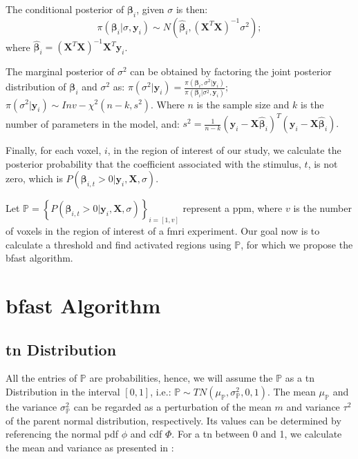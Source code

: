 The conditional posterior of $\bm{\beta}_i$, given $\sigma$ is then:
\begin{equation}
\pi \left( \bm{\beta}_i|\sigma ,\bm{y}_i \right) 
\sim N\left( \bm{\hat{\beta}}_i, 
\left( \bm{X}^T\bm{X} \right)^{-1} \sigma^2 \right);
\end{equation}
where $\bm{\hat{\beta}}_i = \left( \bm{X}^T\bm{X} \right)^{-1}\bm{X}^T \bm{y}_i$.

The marginal posterior of $\sigma^2$ can be obtained by factoring the 
joint posterior distribution of $\bm{\beta}_i$ and $\sigma^2$ as:
$
\pi (\sigma^2|\bm{y}_i) = \frac{\pi \left( \bm{\beta}_i,\sigma^2 
|\bm{y}_i \right)}{\pi \left( \bm{\beta}_i|\sigma^2 ,\bm{y}_i \right)};
$
$
\pi (\sigma^2|\bm{y}_i) \sim Inv- \chi^2(n-k,s^2).
$
Where $n$ is the sample size and $k$ is the number of parameters in the model, and:
$
s^2 = \frac{1}{n-k} \left( \bm{y}_i - \bm{X}\bm{\hat{\beta}}_i \right)^T
 \left( \bm{y}_i - \bm{X}\bm{\hat{\beta}}_i \right).
$

Finally, for each voxel, $i$, in the region of interest of our study, 
we calculate the posterior probability that the coefficient associated with the 
stimulus, $t$, is not zero, which is 
$P(\bm{\beta}_{i,t} > 0 | \bm{y}_i, \bm{X}, \sigma)$.

Let $\bm{\mathbb{P}} = \left\{ P(\bm{\beta}_{i,t} > 0 | \bm{y}_i, \bm{X},\sigma) \right\}_{i=[1,v]}$ 
represent a \gls{ppm}, where $v$ is the number of voxels in the region of interest of a \gls{fmri} experiment. 
Our goal now is to calculate a threshold and find activated regions using $\bm{\mathbb{P}}$, 
for which we propose the \gls{bfast} algorithm.

\section{\texorpdfstring{\gls{bfast}}{BFAST} Algorithm}

\subsection{\texorpdfstring{\acrlong{tn}}{Truncated Nornal} Distribution}

All the entries of $\bm{\mathbb{P}}$ are probabilities, hence, we will assume the
$\bm{\mathbb{P}}$ as a \gls{tn} Distribution in the interval $[0,1]$, i.e.:
$
\bm{\mathbb{P}} \sim TN\left( \mu_{\bm{\mathbb{P}}}, \sigma^2_{\bm{\mathbb{P}}}, 0,1 \right).
$
The mean $\mu_{\bm{\mathbb{P}}}$ and the variance $\sigma^2_{\bm{\mathbb{P}}}$ can be 
regarded as a perturbation of the mean $m$ and variance $\tau^2$ of the parent normal 
distribution, respectively. Its values can be determined by referencing the normal
 \gls{pdf} $\phi$ and \gls{cdf} $\Phi$. For a \gls{tn} between 0 and 1, we calculate the mean and variance as
presented in \cite{johnson1995continuous}:

